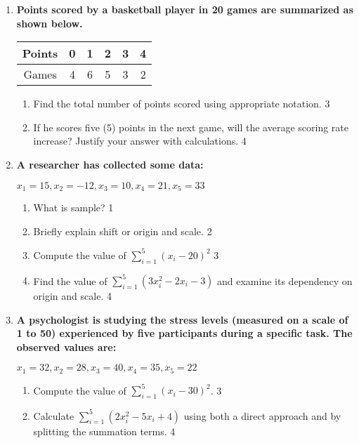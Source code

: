 \documentclass[a4paper,oneside]{book}
\begin{document}
\begin{enumerate}
  \item
\textbf{Points scored by a basketball player in 20 games are summarized as shown below.}

\begin{table}[h]
\centering
\begin{tabular}{|c|ccccc|}
Points & 0 & 1 & 2 & 3 & 4 \\ \hline
Games  & 4 & 6 & 5 & 3 & 2
\end{tabular}
\end{table}

\begin{enumerate}
    \item  
    Find the total number of points scored using appropriate notation. \hfill 3
    \item
    If he scores five (5) points in the next game, will the average scoring rate increase? Justify your answer with calculations. \hfill 4
\end{enumerate}

  
     \item
	  \textbf{A researcher has collected some data:}
	  \begin{center}
	  $x_1=15, x_2=-12, x_3=10, x_4=21, x_5=33$
  \end{center}
  \begin{enumerate}
    \item
	What is sample? \hfill 1
    \item
	Briefly explain shift or origin and scale. \hfill 2
    \item  
	Compute the value of $\displaystyle \sum_{i=1}^5 (x_i-20)^2$ \hfill 3
    \item
	Find the value of $\displaystyle \sum_{i=1}^5 (3x_i^2-2x_i-3)$ and examine its dependency on origin and scale. \hfill 4
  \end{enumerate} 
  
  \item
\textbf{A psychologist is studying the stress levels (measured on a scale 
of 1 to 50) experienced by five participants during a specific task. 
The observed values are:}
\begin{center}
$x_1 = 32, x_2 = 28, x_3 = 40, x_4 = 35, x_5 = 22$
\end{center}
\begin{enumerate}
    \item
    Compute the value of $\displaystyle \sum_{i=1}^5 (x_i - 30)^2$. \hfill 3
    \item
    Calculate $\displaystyle \sum_{i=1}^5 (2x_i^2 - 5x_i + 4)$ using both a direct approach and by splitting the summation terms. \hfill 4
\end{enumerate}



\end{enumerate}
\end{document}
